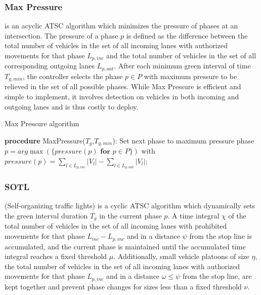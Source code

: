 \documentclass[journal]{IEEEtran}
\begin{document}
\subsubsection{Max Pressure} \cite{varaiya2013max, genders2019opensource} is an acyclic ATSC algorithm which minimizes the pressure of phases at an intersection. The pressure of a phase $p$ is defined as the difference between the total number of vehicles in the set of all incoming lanes with authorized movements for that phase $L_{p,inc}$ and the total number of vehicles in the set of all corresponding outgoing lanes $L_{p,out}$. After each minimum green interval of time $T_{g,min}$, the controller selects the phase $p \in P$ with maximum pressure to be relieved in the set of all possible phases. While Max Pressure is efficient and simple to implement, it involves detection on vehicles in both incoming and outgoing lanes and is thus costly to deploy. 
\\

\begin{algorithm}[H]
\caption*{Max Pressure algorithm}
\begin{algorithmic}
    \STATE \textbf{procedure} MaxPressure($T_g$,$T_{g,min}$):
        \STATE Set next phase to maximum pressure phase
        \STATE $p = arg\max(\{pressure(p) \textbf{ for } p \in P\})$
        \STATE with $pressure(p) = \sum_{l \in L_{p,inc}} |V_l| - \sum_{l \in L_{p,out}} |V_l|$;
    \ENDIF
\end{algorithmic}
\end{algorithm}

\subsubsection{SOTL} \cite{gershenson2004self, genders2019opensource} (Self-organizing traffic lights) is a cyclic ATSC algorithm which dynamically sets the green interval duration $T_g$ in the current phase $p$. A time integral $\chi$ of the total number of vehicles in the set of all incoming lanes with prohibited movements for that phase $L_{inc} - L_{p,inc}$ and in a distance $\psi$ from the stop line is accumulated, and the current phase is maintained until the accumulated time integral reaches a fixed threshold $\mu$. Additionally, small vehicle platoons of size $\eta$, the total number of vehicles in the set of all incoming lanes with authorized movements for that phase $L_{p,inc}$ and in a distance $\omega \le \psi$ from the stop line, are kept together and prevent phase changes for sizes less than a fixed threshold $\nu$. 
\end{document}
